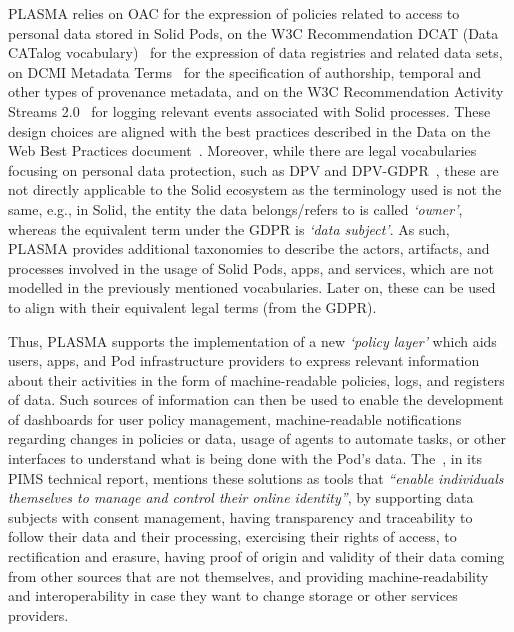 PLASMA relies on OAC for the expression of policies related to access to personal data stored in Solid Pods, on the W3C Recommendation DCAT (Data CATalog vocabulary)~\citep{albertoni_data_2020} for the expression of data registries and related data sets, on DCMI Metadata Terms~\citep{dcmi_usage_board_dcmi_2020} for the specification of authorship, temporal and other types of provenance metadata, and on the W3C Recommendation Activity Streams 2.0~\citep{snell_activity_2017} for logging relevant events associated with Solid processes.
These design choices are aligned with the best practices described in the Data on the Web Best Practices document~\citep{loscio_data_2017}.
Moreover, while there are legal vocabularies focusing on personal data protection, such as DPV and DPV-GDPR~\citep{panetto_creating_2019}, these are not directly applicable to the Solid ecosystem as the terminology used is not the same, e.g., in Solid, the entity the data belongs/refers to is called \textit{`owner'}, whereas the equivalent term under the GDPR is \textit{`data subject'}.
As such, PLASMA provides additional taxonomies to describe the actors, artifacts, and processes involved in the usage of Solid Pods, apps, and services, which are not modelled in the previously mentioned vocabularies.
Later on, these can be used to align with their equivalent legal terms (from the GDPR).

Thus, PLASMA supports the implementation of a new \textit{`policy layer'} which aids users, apps, and Pod infrastructure providers to express relevant information about their activities in the form of machine-readable policies, logs, and registers of data.
Such sources of information can then be used to enable the development of dashboards for user policy management, machine-readable notifications regarding changes in policies or data, usage of agents to automate tasks, or other interfaces to understand what is being done with the Pod's data.
The~\cite{european_data_protection_supervisor_techdispatch_2021}, in its PIMS technical report, mentions these solutions as tools that \textit{``enable individuals themselves to manage and control their online identity''}, by supporting data subjects with consent management, having transparency and traceability to follow their data and their processing, exercising their rights of access, to rectification and erasure, having proof of origin and validity of their data coming from other sources that are not themselves, and providing machine-readability and interoperability in case they want to change storage or other services providers.

